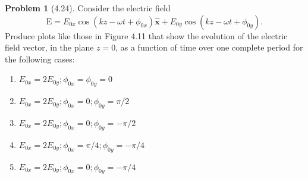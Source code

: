 \documentclass[10pt]{article}
\theoremstyle{definition}
\newtheorem{problem}{Problem}
\newcommand{\ux}{\hat{\mathbf{x}}}
\newcommand{\bv}[1]{\bm{\mathrm{#1}}}
\begin{document}
\begin{problem}[4.24]
Consider the electric field
$$\bv{E}=E_{0x}\cos(kz-\omega t +\phi_{0x})\ux+E_{0y}\cos(kz-\omega t +\phi_{0y}).$$
Produce plots like those in Figure 4.11 that show the evolution of the electric field vector, in the plane $z=0$, as a function of time over one complete period for the following
cases:
\begin{enumerate}[label=(\alph*)]
  \item $E_{0x}=2E_{0y};\phi_{0x}=\phi_{0y}=0$
  \item $E_{0x}=2E_{0y};\phi_{0x}=0;\phi_{0y}=\pi/2$
  \item $E_{0x}=2E_{0y};\phi_{0x}=0;\phi_{0y}=-\pi/2$
  \item $E_{0x}=2E_{0y};\phi_{0x}=\pi/4;\phi_{0y}=-\pi/4$
  \item $E_{0x}=2E_{0y};\phi_{0x}=0;\phi_{0y}=-\pi/4$
\end{enumerate}
\end{problem}
\end{document}
